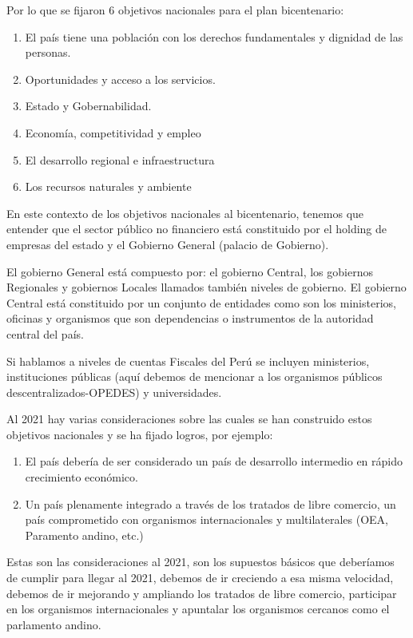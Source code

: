 \documentclass[
  letterpaper,
  DIV=11,
  numbers=noendperiod]{scrartcl}
\providecommand{\tightlist}{%
  \setlength{\itemsep}{0pt}\setlength{\parskip}{0pt}}\usepackage{longtable,booktabs,array}
\begin{document}
Por lo que se fijaron 6 objetivos nacionales para el plan bicentenario:

\begin{enumerate}
\def\labelenumi{\arabic{enumi}.}
\tightlist
\item
  El país tiene una población con los derechos fundamentales y dignidad
  de las personas.
\item
  Oportunidades y acceso a los servicios.
\item
  Estado y Gobernabilidad.
\item
  Economía, competitividad y empleo
\item
  El desarrollo regional e infraestructura
\item
  Los recursos naturales y ambiente
\end{enumerate}

En este contexto de los objetivos nacionales al bicentenario, tenemos
que entender que el sector público no financiero está constituido por el
holding de empresas del estado y el Gobierno General (palacio de
Gobierno).

El gobierno General está compuesto por: el gobierno Central, los
gobiernos Regionales y gobiernos Locales llamados también niveles de
gobierno. El gobierno Central está constituido por un conjunto de
entidades como son los ministerios, oficinas y organismos que son
dependencias o instrumentos de la autoridad central del país.

Si hablamos a niveles de cuentas Fiscales del Perú se incluyen
ministerios, instituciones públicas (aquí debemos de mencionar a los
organismos públicos descentralizados-OPEDES) y universidades.

Al 2021 hay varias consideraciones sobre las cuales se han construido
estos objetivos nacionales y se ha fijado logros, por ejemplo:

\begin{enumerate}
\def\labelenumi{\arabic{enumi}.}
\tightlist
\item
  El país debería de ser considerado un país de desarrollo intermedio en
  rápido crecimiento económico.
\item
  Un país plenamente integrado a través de los tratados de libre
  comercio, un país comprometido con organismos internacionales y
  multilaterales (OEA, Paramento andino, etc.)
\end{enumerate}

Estas son las consideraciones al 2021, son los supuestos básicos que
deberíamos de cumplir para llegar al 2021, debemos de ir creciendo a esa
misma velocidad, debemos de ir mejorando y ampliando los tratados de
libre comercio, participar en los organismos internacionales y apuntalar
los organismos cercanos como el parlamento andino.
\end{document}
